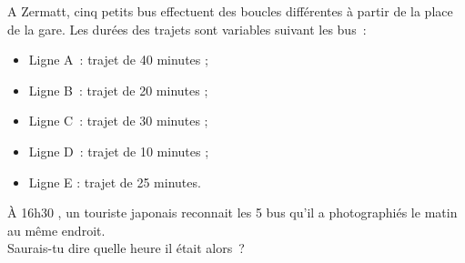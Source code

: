 \begin{exercice}
A Zermatt, cinq petits bus effectuent des boucles différentes à partir de la place de la gare. Les durées des trajets sont variables suivant les bus : \\[-1em]
\begin{itemize}
 \item Ligne A : trajet de 40 minutes ;
 \item Ligne B : trajet de 20 minutes ;
 \item Ligne C : trajet de 30 minutes ;
 \item Ligne D : trajet de 10 minutes ;
 \item Ligne E : trajet de 25 minutes.
 \end{itemize}
À 16h30 , un touriste japonais reconnait les 5 bus qu'il a photographiés le matin au même endroit. \\[0.5em]
Saurais-tu dire quelle heure il était alors ?
\end{exercice}
